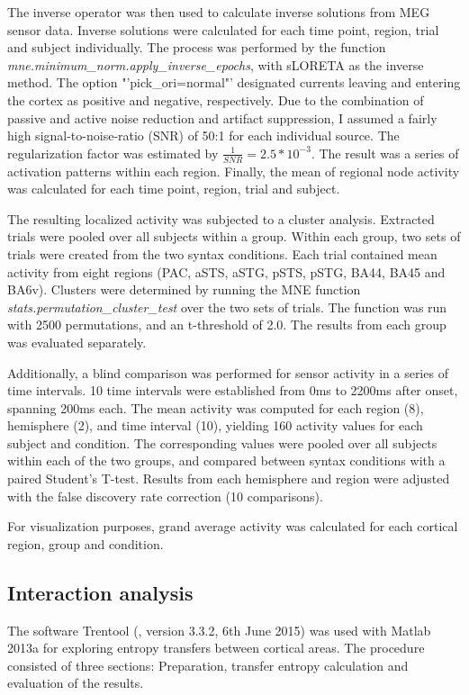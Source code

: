 The inverse operator was then used to calculate inverse solutions from MEG sensor data.
Inverse solutions were calculated for each time point, region, trial and subject individually.
The process was performed by the function \emph{mne.minimum\_norm.apply\_inverse\_epochs}, with sLORETA as the inverse method.
The option "'pick\_ori=normal"' designated currents leaving and entering the cortex as positive and negative, respectively.
Due to the combination of passive and active noise reduction and artifact suppression, I assumed a fairly high signal-to-noise-ratio (SNR) of 50:1 for each individual source.
The regularization factor was estimated by $\frac{1}{SNR} = 2.5*10^{-3}$.
The result was a series of activation patterns within each region.
Finally, the mean of regional node activity was calculated for each time point, region, trial and subject.

The resulting localized activity was subjected to a cluster analysis.
Extracted trials were pooled over all subjects within a group.
Within each group, two sets of trials were created from the two syntax conditions.
Each trial contained mean activity from eight regions (PAC, aSTS, aSTG, pSTS, pSTG, BA44, BA45 and BA6v).
Clusters were determined by running the MNE function \emph{stats.permutation\_cluster\_test} \cite{3.3.clustertest} over the two sets of trials.
The function was run with 2500 permutations, and an t-threshold of 2.0.
The results from each group was evaluated separately.

Additionally, a blind comparison was performed for sensor activity in a series of time intervals.
10 time intervals were established from 0ms to 2200ms after onset, spanning 200ms each.
The mean activity was computed for each region (8), hemisphere (2), and time interval (10), yielding 160 activity values for each subject and condition.
The corresponding values were pooled over all subjects within each of the two groups, and compared between syntax conditions with a paired Student's T-test.
Results from each hemisphere and region were adjusted with the false discovery rate correction (10 comparisons).

For visualization purposes, grand average activity was calculated for each cortical region, group and condition.\subsection{Interaction analysis}

The software Trentool (\cite{3.4.Trentool}, version 3.3.2, 6th June 2015) was used with Matlab 2013a for exploring entropy transfers between cortical areas.
The procedure consisted of three sections: Preparation, transfer entropy calculation and evaluation of the results.

